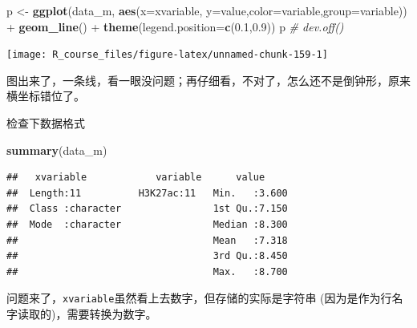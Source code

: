 \documentclass[]{article}
\newenvironment{Shaded}{\begin{snugshade}}{\end{snugshade}}
\newcommand{\KeywordTok}[1]{\textcolor[rgb]{0.13,0.29,0.53}{\textbf{{#1}}}}
\newcommand{\DataTypeTok}[1]{\textcolor[rgb]{0.13,0.29,0.53}{{#1}}}
\newcommand{\FloatTok}[1]{\textcolor[rgb]{0.00,0.00,0.81}{{#1}}}
\newcommand{\StringTok}[1]{\textcolor[rgb]{0.31,0.60,0.02}{{#1}}}
\newcommand{\CommentTok}[1]{\textcolor[rgb]{0.56,0.35,0.01}{\textit{{#1}}}}
\newcommand{\NormalTok}[1]{{#1}}
\numberwithin{figure}{section}
\numberwithin{table}{section}
\theoremstyle{definition}
\theoremstyle{definition}
\theoremstyle{definition}
\theoremstyle{remark}
\begin{document}
\begin{Shaded}
\begin{Highlighting}[]
\NormalTok{p <-}\StringTok{ }\KeywordTok{ggplot}\NormalTok{(data_m, }\KeywordTok{aes}\NormalTok{(}\DataTypeTok{x=}\NormalTok{xvariable, }\DataTypeTok{y=}\NormalTok{value,}\DataTypeTok{color=}\NormalTok{variable,}\DataTypeTok{group=}\NormalTok{variable)) +}\StringTok{ }
\StringTok{     }\KeywordTok{geom_line}\NormalTok{() +}\StringTok{ }\KeywordTok{theme}\NormalTok{(}\DataTypeTok{legend.position=}\KeywordTok{c}\NormalTok{(}\FloatTok{0.1}\NormalTok{,}\FloatTok{0.9}\NormalTok{))}
\NormalTok{p}
\CommentTok{# dev.off()}
\end{Highlighting}
\end{Shaded}

\begin{center}\texttt{[image: R\_course\_files/figure-latex/unnamed-chunk-159-1]} \end{center}

图出来了，一条线，看一眼没问题；再仔细看，不对了，怎么还不是倒钟形，原来横坐标错位了。

检查下数据格式

\begin{Shaded}
\begin{Highlighting}[]
\KeywordTok{summary}\NormalTok{(data_m)}
\end{Highlighting}
\end{Shaded}

\begin{verbatim}
##   xvariable            variable      value      
##  Length:11          H3K27ac:11   Min.   :3.600  
##  Class :character                1st Qu.:7.150  
##  Mode  :character                Median :8.300  
##                                  Mean   :7.318  
##                                  3rd Qu.:8.450  
##                                  Max.   :8.700
\end{verbatim}

问题来了，\texttt{xvariable}虽然看上去数字，但存储的实际是字符串
(因为是作为行名字读取的)，需要转换为数字。

\begin{Shaded}
\end{Shaded}
\end{document}
